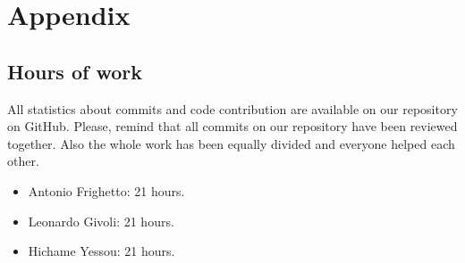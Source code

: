 \chapter*{Appendix}

\section*{Hours of work}
All statistics about commits and code contribution are available on our repository on GitHub. Please, remind that all commits on our repository have been reviewed together. Also the whole work has been equally divided and everyone helped each other.

\begin{itemize}
    \item Antonio Frighetto: 21 hours.
    \item Leonardo Givoli: 21 hours.
    \item Hichame Yessou: 21 hours.
\end{itemize}